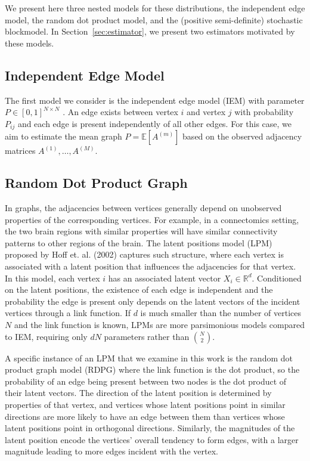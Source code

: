\documentclass[10pt,letterpaper]{article}
\renewcommand{\Re}{\mathbb{R}}
\newcommand{\Ex}{\mathbb{E}}
\begin{document}
We present here three nested models for these distributions, the independent edge model, the random dot product model, and the (positive semi-definite) stochastic blockmodel.
In Section~\ref{sec:estimator}, we present two estimators motivated by these models.



\subsection{Independent Edge Model}
The first model we consider is the independent edge model (IEM) with parameter $P \in [0,1]^{N\times N}$ \cite{bollobas2007phase}.
An edge exists between vertex $i$ and vertex $j$ with probability $P_{ij}$ and each edge is present independently of all other edges. 
For this case, we aim to estimate the mean graph $P=\Ex[A^{(m)}]$ based on the observed adjacency matrices $A^{(1)},\dotsc,A^{(M)}$.


\subsection{Random Dot Product Graph}
In graphs, the adjacencies between vertices generally depend on unobserved properties of the corresponding vertices. For example, in a connectomics setting, the two brain regions with similar properties will have similar connectivity patterns to other regions of the brain.
The latent positions model (LPM) proposed by Hoff et. al. (2002) \cite{hoff2002latent} captures such structure, where each vertex is associated with a latent position that influences the adjacencies for that vertex.
In this model, each vertex $i$ has an associated latent vector $X_i \in \Re^d$.
Conditioned on the latent positions, the existence of each edge is independent and the probability the edge is present only depends on the latent vectors of the incident vertices through a link function. If $d$ is much smaller than the number of vertices $N$ and the link function is known, LPMs are more parsimonious models compared to IEM, requiring only $dN$ parameters rather than $\binom{N}{2}$.

A specific instance of an LPM that we examine in this work is the random dot product graph model (RDPG) \cite{young2007random, nickel2007random} where the link function is the dot product, so the probability of an edge being present between two nodes is the dot product of their latent vectors.
The direction of the latent position is determined by properties of that vertex, and vertices whose latent positions point in similar directions are more likely to have an edge between them than vertices whose latent positions point in orthogonal directions.
Similarly, the magnitudes of the latent position encode the vertices' overall tendency to form edges, with a larger magnitude leading to more edges incident with the vertex.
\end{document}
